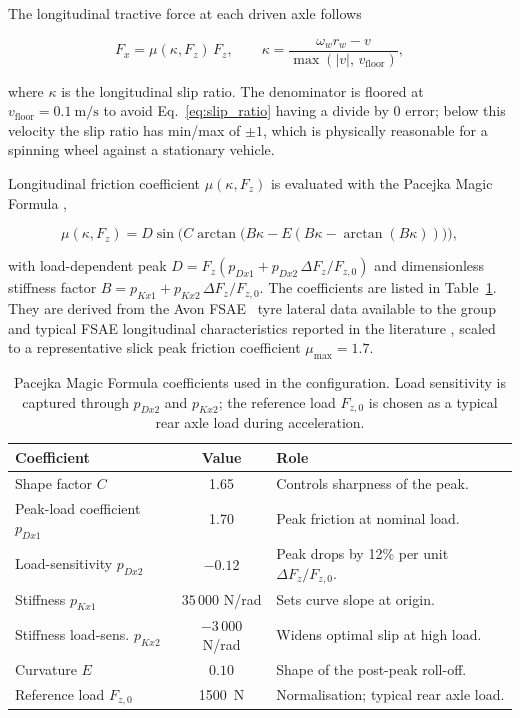 \documentclass[11pt, a4paper]{report}
\numberwithin{equation}{section}
\begin{document}
\begin{refsection}
The longitudinal tractive force at each driven axle follows

\begin{equation}
F_x = \mu(\kappa, F_z)\, F_z,
\qquad
\kappa = \frac{\omega_w r_w - v}{\max(|v|,\, v_\text{floor})},
\label{eq:slip_ratio}
\end{equation}

where $\kappa$ is the longitudinal slip ratio. The denominator is
floored at $v_\text{floor} = \SI{0.1}{\metre\per\second}$ to avoid
Eq.~\ref{eq:slip_ratio} having a divide by 0 error; below this velocity
the slip ratio has min/max of $\pm 1$, which is physically reasonable for a spinning wheel
against a stationary vehicle.

Longitudinal friction coefficient $\mu(\kappa, F_z)$ is evaluated with
the Pacejka Magic Formula \cite{pacejka2012},

\begin{equation}
\mu(\kappa, F_z) = D \sin\!\Big( C \arctan\!\big( B\kappa - E(B\kappa - \arctan(B\kappa)) \big) \Big),
\label{eq:pacejka}
\end{equation}

with load-dependent peak $D = F_z (p_{Dx1} + p_{Dx2}\,\Delta F_z /
F_{z,0})$ and dimensionless stiffness factor $B = p_{Kx1} +
p_{Kx2}\,\Delta F_z / F_{z,0}$.
The coefficients are listed in
Table~\ref{tab:pacejka}. They are derived from the Avon FSAE~\cite{fsae_engineering_forum} tyre
lateral data available to the group and typical FSAE longitudinal
characteristics reported in the literature \cite{milliken1995,
pacejka2012}, scaled to a representative slick peak friction coefficient
$\mu_\text{max} = 1.7$.

\begin{table}[H]
\centering
\caption{Pacejka Magic Formula coefficients used in the
configuration. Load sensitivity is captured through $p_{Dx2}$ and
$p_{Kx2}$; the reference load $F_{z,0}$ is chosen as a typical rear
axle load during acceleration.}
\label{tab:pacejka}
\footnotesize
\begin{tabular}{|l|c|l|}
\hline
\textbf{Coefficient} & \textbf{Value} & \textbf{Role} \\
\hline
Shape factor $C$                & 1.65   & Controls sharpness of the peak. \\
Peak-load coefficient $p_{Dx1}$ & 1.70   & Peak friction at nominal load. \\
Load-sensitivity $p_{Dx2}$      & $-0.12$ & Peak drops by 12\% per unit $\Delta F_z / F_{z,0}$. \\
Stiffness $p_{Kx1}$             & $35\,000$ N/rad & Sets curve slope at origin. \\
Stiffness load-sens. $p_{Kx2}$  & $-3\,000$ N/rad & Widens optimal slip at high load. \\
Curvature $E$                   & $0.10$ & Shape of the post-peak roll-off. \\
Reference load $F_{z,0}$        & \SI{1500}{\newton} & Normalisation; typical rear axle load. \\
\hline
\end{tabular}
\end{table}


\end{refsection}
\end{document}
